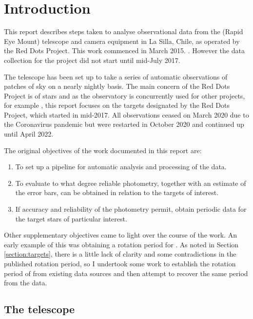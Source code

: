 \section{Introduction}
\protect\label{section:intro}

\engdate

This report describes steps taken to analyse observational data from the
{\rem} (Rapid Eye Mount) telescope and camera equipment in La Silla, Chile, as
operated by the Red Dots Project. This work commenced in March 2015.
\citep{reddotsspace20}. However the data collection for the project did not
start until mid-July 2017.

The {\rem} telescope has been set up to take a series of automatic
observations of patches of sky on a nearly nightly basis. The main concern of
the Red Dots Project is of {\rdwarf} stars and as the {\rem} observatory is
concurrently used for other projects, for example \citet{giannini18}, this
report focuses on the {\rdwarf} targets designated by the Red Dots Project,
which started in mid-2017. All observations ceased on March 2020 due to the
Coronavirus pandemic but were restarted in October 2020 and continued up until April 2022.

The original objectives of the work documented in this report are:
\begin{enumerate}
  \item To set up a pipeline for automatic analysis and processing of the data.
  \item To evaluate to what degree reliable photometry, together with an
  estimate of the error bars, can be obtained in relation to the targets of
  interest.
  \item If accuracy and reliability of the photometry permit, obtain periodic
  data for the target stars of particular interest.
\end{enumerate}

Other supplementary objectives came to light over the course of the work. An
early example of this was obtaining a rotation period for \ross. As noted in
Section \ref{section:targets}, there is a little lack of clarity and some
contradictions in the published rotation period, so I undertook some work to establish the rotation period of {\ross}
from existing data sources and then attempt to recover the same period from the {\rem} data.

\subsection{The {\rem} telescope}
\protect\label{section:remscope}


